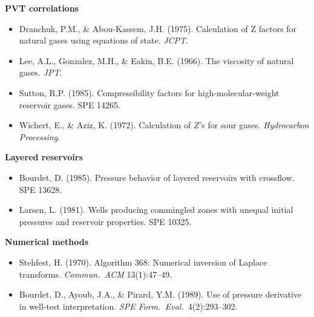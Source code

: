 \documentclass[11pt,a4paper]{article}
\begin{document}
\noindent\textbf{PVT correlations}\par
\begin{itemize}[leftmargin=*,nosep]
\item Dranchuk, P.M., \& Abou-Kassem, J.H. (1975). Calculation of Z factors for natural gases using equations of state. \emph{JCPT}.
\item Lee, A.L., Gonzalez, M.H., \& Eakin, B.E. (1966). The viscosity of natural gases. \emph{JPT}.
\item Sutton, R.P. (1985). Compressibility factors for high-molecular-weight reservoir gases. SPE 14265.
\item Wichert, E., \& Aziz, K. (1972). Calculation of $Z$'s for sour gases. \emph{Hydrocarbon Processing}.
\end{itemize}

\noindent\textbf{Layered reservoirs}\par
\begin{itemize}[leftmargin=*,nosep]
\item Bourdet, D. (1985). Pressure behavior of layered reservoirs with crossflow. SPE 13628.
\item Larsen, L. (1981). Wells producing commingled zones with unequal initial pressures and reservoir properties. SPE 10325.
\end{itemize}

\noindent\textbf{Numerical methods}\par
\begin{itemize}[leftmargin=*,nosep]
\item Stehfest, H. (1970). Algorithm 368: Numerical inversion of Laplace transforms. \emph{Commun.\ ACM} 13(1):47--49.
\item Bourdet, D., Ayoub, J.A., \& Pirard, Y.M. (1989). Use of pressure derivative in well-test interpretation. \emph{SPE Form.\ Eval.}\ 4(2):293--302.
\end{itemize}
\end{document}
